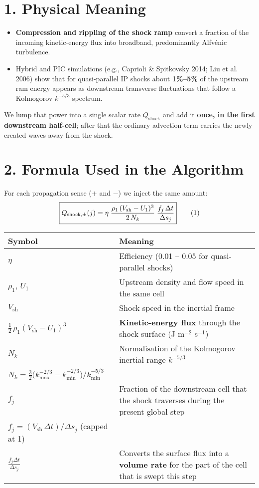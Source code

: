 \section*{1. Physical Meaning}

\begin{itemize}
\item \textbf{Compression and rippling of the shock ramp} convert a fraction of the incoming kinetic-energy flux into broadband, predominantly Alfvénic turbulence.
\item Hybrid and PIC simulations (e.g., Caprioli \& Spitkovsky 2014; Liu et al. 2006) show that for quasi-parallel IP shocks about \textbf{1\%–5\%} of the upstream ram energy appears as downstream transverse fluctuations that follow a Kolmogorov $k^{-5/3}$ spectrum.
\end{itemize}

We lump that power into a single scalar rate $Q_{\text{shock}}$ and add it \textbf{once, in the first downstream half-cell}; after that the ordinary advection term carries the newly created waves away from the shock.

\section*{2. Formula Used in the Algorithm}

For each propagation sense ($+$ and $-$) we inject the same amount:
\[
\boxed{%
Q_{\text{shock},\pm}(j)
   = \eta\;
     \frac{\rho_1\,(V_{\text{sh}}-U_1)^{3}}{2\,N_k}\;
     \frac{f_j\,\Delta t}{\Delta s_j}
}\tag{1}
\]
\begin{tabular}{|l|l|}
\hline
\textbf{Symbol} & \textbf{Meaning} \\
\hline
$\eta$ & Efficiency (0.01 -- 0.05 for quasi-parallel shocks) \\
$\rho_1,\,U_1$ & Upstream density and flow speed in the same cell \\
$V_{\text{sh}}$ & Shock speed in the inertial frame \\
$\frac12\,\rho_1(V_{\text{sh}}-U_1)^3$ & \textbf{Kinetic-energy flux} through the shock surface (J m$^{-2}$ s$^{-1}$) \\
$N_k$ & Normalisation of the Kolmogorov inertial range $k^{-5/3}$ \\
$N_k=\frac{3}{2}\bigl(k_{\max}^{-2/3}-k_{\min}^{-2/3}\bigr)/k_{\min}^{-5/3}$ & \\
$f_j$ & Fraction of the downstream cell that the shock traverses during the present global step \\
$f_j=(V_{\text{sh}}\,\Delta t)/\Delta s_j$ (capped at 1) & \\
$\frac{f_j\Delta t}{\Delta s_j}$ & Converts the surface flux into a \textbf{volume rate} for the part of the cell that is swept this step \\
\hline
\end{tabular}

